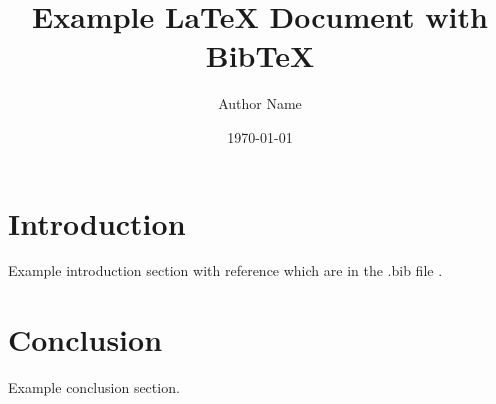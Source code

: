 \documentclass{article}
\begin{document}
\title{Example LaTeX Document with BibTeX}
\author{Author Name}
\date{\today}

\maketitle

\section{Introduction}
Example introduction section with reference which are in the .bib file \cite{example2025}.

\section{Conclusion}
Example conclusion section.

\clearpage
\end{document}
